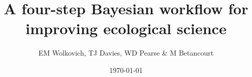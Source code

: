 \documentclass[11pt]{article}
\begin{document}

\renewcommand{\refname}{\CHead{}}




\title{A four-step Bayesian workflow for improving ecological science}
\date{\today}
\author{EM Wolkovich, TJ Davies, WD Pearse \& M Betancourt}
\maketitle
\end{document}
